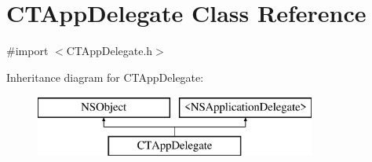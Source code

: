 \hypertarget{interface_c_t_app_delegate}{\section{C\-T\-App\-Delegate Class Reference}
\label{interface_c_t_app_delegate}
}


{\ttfamily \#import $<$C\-T\-App\-Delegate.\-h$>$}

Inheritance diagram for C\-T\-App\-Delegate\-:\begin{figure}[H]
\begin{center}
\leavevmode
\includegraphics[height=2.000000cm]{interface_c_t_app_delegate}
\end{center}
\end{figure}
